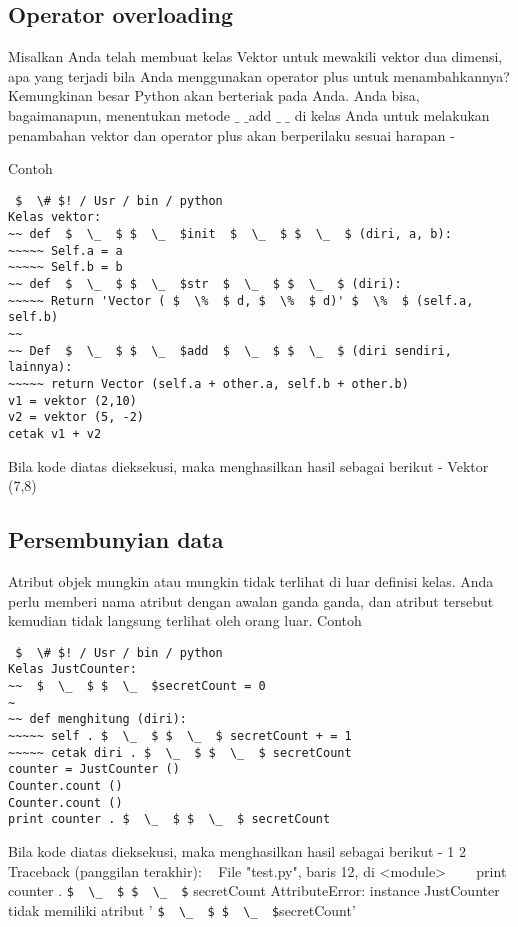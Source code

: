 \subsection{Operator overloading}
Misalkan Anda telah membuat kelas Vektor untuk mewakili vektor dua dimensi, apa yang terjadi bila Anda menggunakan operator plus untuk menambahkannya? Kemungkinan besar Python akan berteriak pada Anda. Anda bisa, bagaimanapun, menentukan metode  $  \_  $ $  \_  $add $  \_  $ $  \_  $ di kelas Anda untuk melakukan penambahan vektor dan operator plus akan berperilaku sesuai harapan - \par
Contoh

\begin{verbatim}
 $  \# $! / Usr / bin / python
Kelas vektor:
~~ def  $  \_  $ $  \_  $init  $  \_  $ $  \_  $ (diri, a, b):
~~~~~ Self.a = a
~~~~~ Self.b = b
~~ def  $  \_  $ $  \_  $str  $  \_  $ $  \_  $ (diri):
~~~~~ Return 'Vector ( $  \%  $ d, $  \%  $ d)' $  \%  $ (self.a, self.b)
~~
~~ Def  $  \_  $ $  \_  $add  $  \_  $ $  \_  $ (diri sendiri, lainnya):
~~~~~ return Vector (self.a + other.a, self.b + other.b)
v1 = vektor (2,10)
v2 = vektor (5, -2)
cetak v1 + v2
\end{verbatim}

Bila kode diatas dieksekusi, maka menghasilkan hasil sebagai berikut -
Vektor (7,8)

\subsection{Persembunyian data}
Atribut objek mungkin atau mungkin tidak terlihat di luar definisi kelas. Anda perlu memberi nama atribut dengan awalan ganda ganda, dan atribut tersebut kemudian tidak langsung terlihat oleh orang luar.
Contoh

\begin{verbatim}
 $  \# $! / Usr / bin / python
Kelas JustCounter:
~~  $  \_  $ $  \_  $secretCount = 0
~
~~ def menghitung (diri):
~~~~~ self . $  \_  $ $  \_  $ secretCount + = 1
~~~~~ cetak diri . $  \_  $ $  \_  $ secretCount
counter = JustCounter ()
Counter.count ()
Counter.count ()
print counter . $  \_  $ $  \_  $ secretCount
\end{verbatim}

Bila kode diatas dieksekusi, maka menghasilkan hasil sebagai berikut -
1
2
Traceback (panggilan terakhir):
~ File "test.py", baris 12, di <module>
~~~ print counter . \verb|$  \_  $ $  \_  $| secretCount
AttributeError: instance JustCounter tidak memiliki atribut ' \verb|$  \_  $ $  \_  $|secretCount'

